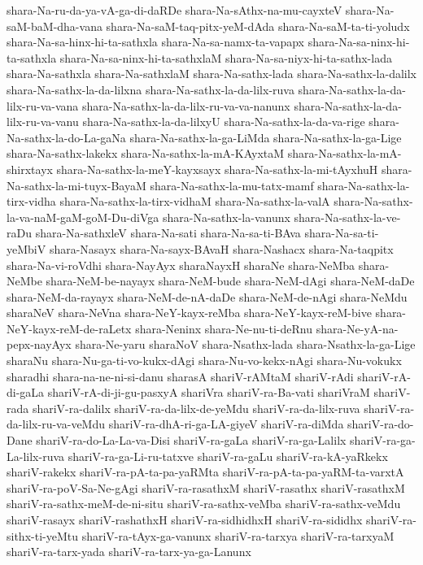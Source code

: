 {shara-Na-ru-da-ya-vA-ga-di-daRDe
shara-Na-sAthx-na-mu-cayxteV
shara-Na-saM-baM-dha-vana
shara-Na-saM-taq-pitx-yeM-dAda
shara-Na-saM-ta-ti-yoludx
shara-Na-sa-hinx-hi-ta-sathxla
shara-Na-sa-namx-ta-vapapx
shara-Na-sa-ninx-hi-ta-sathxla
shara-Na-sa-ninx-hi-ta-sathxlaM
shara-Na-sa-niyx-hi-ta-sathx-lada
shara-Na-sathxla
shara-Na-sathxlaM
shara-Na-sathx-lada
shara-Na-sathx-la-dalilx
shara-Na-sathx-la-da-lilxna
shara-Na-sathx-la-da-lilx-ruva
shara-Na-sathx-la-da-lilx-ru-va-vana
shara-Na-sathx-la-da-lilx-ru-va-va-nanunx
shara-Na-sathx-la-da-lilx-ru-va-vanu
shara-Na-sathx-la-da-lilxyU
shara-Na-sathx-la-da-va-rige
shara-Na-sathx-la-do-La-gaNa
shara-Na-sathx-la-ga-LiMda
shara-Na-sathx-la-ga-Lige
shara-Na-sathx-lakekx
shara-Na-sathx-la-mA-KAyxtaM
shara-Na-sathx-la-mA-shirxtayx
shara-Na-sathx-la-meY-kayxsayx
shara-Na-sathx-la-mi-tAyxhuH
shara-Na-sathx-la-mi-tuyx-BayaM
shara-Na-sathx-la-mu-tatx-mamf
shara-Na-sathx-la-tirx-vidha
shara-Na-sathx-la-tirx-vidhaM
shara-Na-sathx-la-valA
shara-Na-sathx-la-va-naM-gaM-goM-Du-diVga
shara-Na-sathx-la-vanunx
shara-Na-sathx-la-ve-raDu
shara-Na-sathxleV
shara-Na-sati
shara-Na-sa-ti-BAva
shara-Na-sa-ti-yeMbiV
shara-Nasayx
shara-Na-sayx-BAvaH
shara-Nashacx
shara-Na-taqpitx
shara-Na-vi-roVdhi
shara-NayAyx
sharaNayxH
sharaNe
shara-NeMba
shara-NeMbe
shara-NeM-be-nayayx
shara-NeM-bude
shara-NeM-dAgi
shara-NeM-daDe
shara-NeM-da-rayayx
shara-NeM-de-nA-daDe
shara-NeM-de-nAgi
shara-NeMdu
sharaNeV
shara-NeVna
shara-NeY-kayx-reMba
shara-NeY-kayx-reM-bive
shara-NeY-kayx-reM-de-raLetx
shara-Neninx
shara-Ne-nu-ti-deRnu
shara-Ne-yA-na-pepx-nayAyx
shara-Ne-yaru
sharaNoV
shara-Nsathx-lada
shara-Nsathx-la-ga-Lige
sharaNu
shara-Nu-ga-ti-vo-kukx-dAgi
shara-Nu-vo-kekx-nAgi
shara-Nu-vokukx
sharadhi
shara-na-ne-ni-si-danu
sharasA
shariV-rAMtaM
shariV-rAdi
shariV-rA-di-gaLa
shariV-rA-di-ji-gu-pasxyA
shariVra
shariV-ra-Ba-vati
shariVraM
shariV-rada
shariV-ra-dalilx
shariV-ra-da-lilx-de-yeMdu
shariV-ra-da-lilx-ruva
shariV-ra-da-lilx-ru-va-veMdu
shariV-ra-dhA-ri-ga-LA-giyeV
shariV-ra-diMda
shariV-ra-do-Dane
shariV-ra-do-La-La-va-Disi
shariV-ra-gaLa
shariV-ra-ga-Lalilx
shariV-ra-ga-La-lilx-ruva
shariV-ra-ga-Li-ru-tatxve
shariV-ra-gaLu
shariV-ra-kA-yaRkekx
shariV-rakekx
shariV-ra-pA-ta-pa-yaRMta
shariV-ra-pA-ta-pa-yaRM-ta-varxtA
shariV-ra-poV-Sa-Ne-gAgi
shariV-ra-rasathxM
shariV-rasathx
shariV-rasathxM
shariV-ra-sathx-meM-de-ni-situ
shariV-ra-sathx-veMba
shariV-ra-sathx-veMdu
shariV-rasayx
shariV-rashathxH
shariV-ra-sidhidhxH
shariV-ra-sididhx
shariV-ra-sithx-ti-yeMtu
shariV-ra-tAyx-ga-vanunx
shariV-ra-tarxya
shariV-ra-tarxyaM
shariV-ra-tarx-yada
shariV-ra-tarx-ya-ga-Lanunx
}
